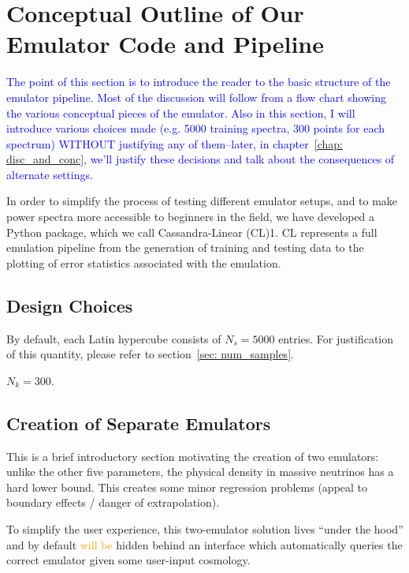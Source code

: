 \chapter{Conceptual Outline of Our Emulator Code and Pipeline}

\textcolor{blue}{The point of this section is to introduce the reader to the
basic structure of the emulator pipeline. Most of the discussion will follow
from a flow chart showing the various conceptual pieces of the emulator. Also
in this section, I will introduce various choices made (e.g. 5000 training
spectra, 300 points for each spectrum) WITHOUT justifying any of them--later,
in chapter~\ref{chap: disc_and_conc}, we'll justify these decisions and
talk about the consequences of alternate settings.}

In order to simplify the process of testing different emulator setups, and to make power
spectra more accessible to beginners in the field, we have developed a Python package,
which we call Cassandra-Linear (CL)1. CL represents a full emulation pipeline from the
generation of training and testing data to the plotting of error statistics associated with
the emulation.


\section{Design Choices}

By default, each Latin hypercube consists of $N_s = 5000$ entries. For 
justification of this quantity, please refer to
section~\ref{sec: num_samples}.

$N_k = 300$.

\section{Creation of Separate Emulators}
\label{sec: 2emu_intro}

This is a brief introductory section motivating the creation of two emulators:
unlike the other five parameters, the physical density in massive neutrinos 
has a hard lower bound. This creates some minor regression problems (appeal to 
boundary effects / danger of extrapolation).

To simplify the user experience, this two-emulator solution lives ``under the
hood'' and by default \textcolor{orange}{will be} hidden behind an interface
which automatically queries the correct emulator given some user-input
cosmology.

